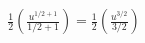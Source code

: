 \documentclass[preview]{standalone}
\begin{document}
\begin{align*}
\frac{1}{2} \left( \frac{u^{1/2+1}}{1/2+1} \right) = \frac{1}{2} \left( \frac{u^{3/2}}{3/2} \right)
\end{align*}
\end{document}
